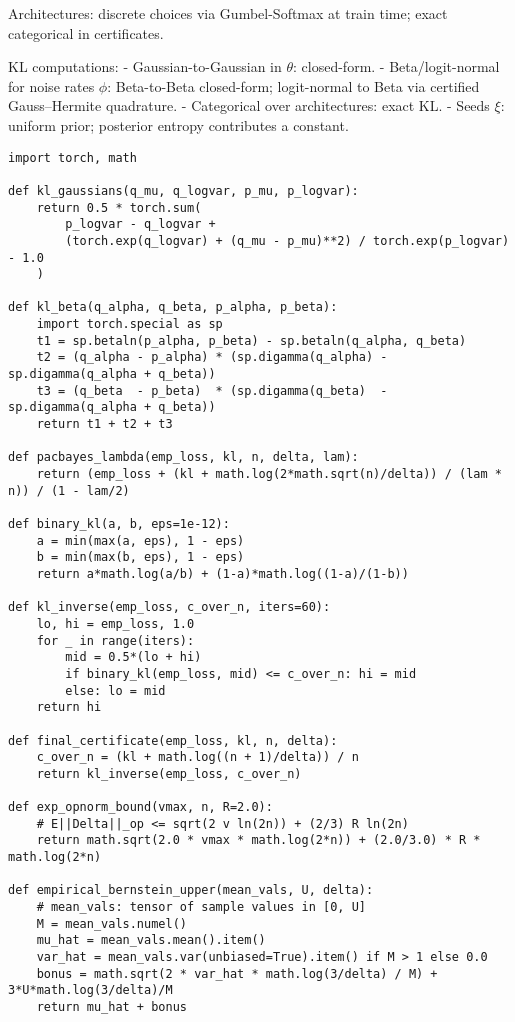 \documentclass{article}
\begin{document}
Architectures: discrete choices via Gumbel-Softmax at train time; exact categorical in certificates.

KL computations:
- Gaussian-to-Gaussian in $\theta$: closed-form.
- Beta/logit-normal for noise rates $\phi$: Beta-to-Beta closed-form; logit-normal to Beta via certified Gauss–Hermite quadrature.
- Categorical over architectures: exact KL.
- Seeds $\xi$: uniform prior; posterior entropy contributes a constant.

\begin{lstlisting}[style=py, caption={PAC-Bayes objectives, empirical-Bernstein mixture gap, and expectation bound.}]
import torch, math

def kl_gaussians(q_mu, q_logvar, p_mu, p_logvar):
    return 0.5 * torch.sum(
        p_logvar - q_logvar +
        (torch.exp(q_logvar) + (q_mu - p_mu)**2) / torch.exp(p_logvar) - 1.0
    )

def kl_beta(q_alpha, q_beta, p_alpha, p_beta):
    import torch.special as sp
    t1 = sp.betaln(p_alpha, p_beta) - sp.betaln(q_alpha, q_beta)
    t2 = (q_alpha - p_alpha) * (sp.digamma(q_alpha) - sp.digamma(q_alpha + q_beta))
    t3 = (q_beta  - p_beta)  * (sp.digamma(q_beta)  - sp.digamma(q_alpha + q_beta))
    return t1 + t2 + t3

def pacbayes_lambda(emp_loss, kl, n, delta, lam):
    return (emp_loss + (kl + math.log(2*math.sqrt(n)/delta)) / (lam * n)) / (1 - lam/2)

def binary_kl(a, b, eps=1e-12):
    a = min(max(a, eps), 1 - eps)
    b = min(max(b, eps), 1 - eps)
    return a*math.log(a/b) + (1-a)*math.log((1-a)/(1-b))

def kl_inverse(emp_loss, c_over_n, iters=60):
    lo, hi = emp_loss, 1.0
    for _ in range(iters):
        mid = 0.5*(lo + hi)
        if binary_kl(emp_loss, mid) <= c_over_n: hi = mid
        else: lo = mid
    return hi

def final_certificate(emp_loss, kl, n, delta):
    c_over_n = (kl + math.log((n + 1)/delta)) / n
    return kl_inverse(emp_loss, c_over_n)

def exp_opnorm_bound(vmax, n, R=2.0):
    # E||Delta||_op <= sqrt(2 v ln(2n)) + (2/3) R ln(2n)
    return math.sqrt(2.0 * vmax * math.log(2*n)) + (2.0/3.0) * R * math.log(2*n)

def empirical_bernstein_upper(mean_vals, U, delta):
    # mean_vals: tensor of sample values in [0, U]
    M = mean_vals.numel()
    mu_hat = mean_vals.mean().item()
    var_hat = mean_vals.var(unbiased=True).item() if M > 1 else 0.0
    bonus = math.sqrt(2 * var_hat * math.log(3/delta) / M) + 3*U*math.log(3/delta)/M
    return mu_hat + bonus
\end{lstlisting}
\end{document}
